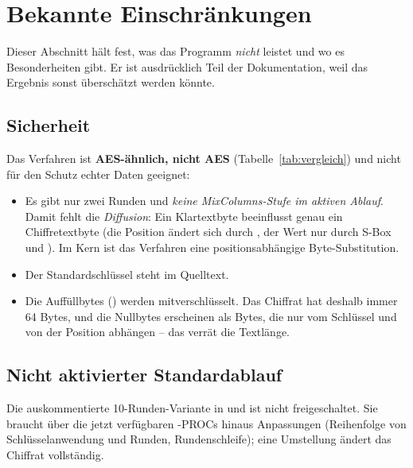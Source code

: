 \section{Bekannte Einschränkungen}\label{sec:einschraenkungen}
Dieser Abschnitt hält fest, was das Programm \emph{nicht} leistet und wo es Besonderheiten gibt. Er ist ausdrücklich Teil der Dokumentation, weil das Ergebnis sonst überschätzt werden könnte.

\subsection{Sicherheit}
Das Verfahren ist \textbf{AES-ähnlich, nicht AES} (Tabelle~\ref{tab:vergleich}) und nicht für den Schutz echter Daten geeignet:
\begin{itemize}[noitemsep]
    \item Es gibt nur zwei Runden und \emph{keine MixColumns-Stufe im aktiven Ablauf}. Damit fehlt die \emph{Diffusion}: Ein Klartextbyte beeinflusst genau ein Chiffretextbyte (die Position ändert sich durch , der Wert nur durch S-Box und ). Im Kern ist das Verfahren eine positionsabhängige Byte-Substitution.
    \item Der Standardschlüssel steht im Quelltext.
    \item Die Auffüllbytes () werden mitverschlüsselt. Das Chiffrat hat deshalb immer 64 Bytes, und die Nullbytes erscheinen als Bytes, die nur vom Schlüssel und von der Position abhängen -- das verrät die Textlänge.
\end{itemize}

\subsection{Nicht aktivierter Standardablauf}
Die auskommentierte 10-Runden-Variante in  und  ist nicht freigeschaltet. Sie braucht über die jetzt verfügbaren -PROCs hinaus Anpassungen (Reihenfolge von Schlüsselanwendung und Runden, Rundenschleife); eine Umstellung ändert das Chiffrat vollständig.

